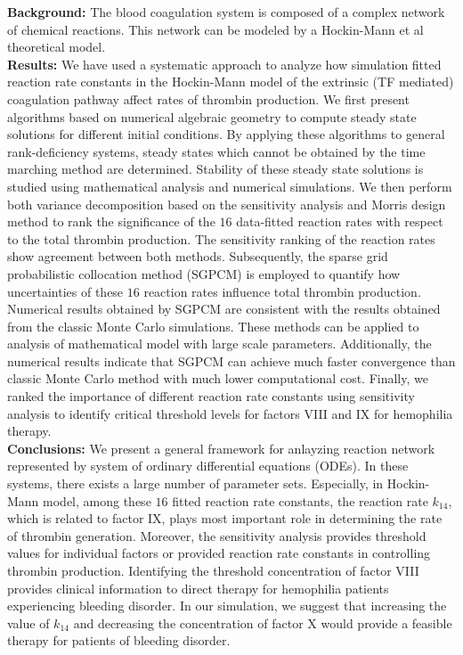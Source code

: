 {\bf Background:} The blood coagulation system is composed of a
complex network of chemical reactions. This network can be modeled
by a Hockin-Mann et al theoretical model.
\\{\bf Results:}
We have used a systematic approach to analyze how simulation fitted
reaction rate constants in the Hockin-Mann model of the extrinsic
(TF mediated) coagulation pathway affect rates of thrombin
production. We first present algorithms based on numerical algebraic
geometry to compute steady state solutions for different initial
conditions. By applying these algorithms to general rank-deficiency
systems, steady states which cannot be obtained by the time marching
method are determined. Stability of these steady state solutions is
studied using mathematical analysis and numerical simulations. We
then perform both variance decomposition based on the sensitivity
analysis and Morris design method to rank the significance of the
$16$ data-fitted reaction rates with respect to the total thrombin
production. The sensitivity ranking of the reaction rates show
agreement between both methods. Subsequently, the sparse grid
probabilistic collocation method (SGPCM) is employed to quantify how
uncertainties of these $16$ reaction rates influence total thrombin
production. Numerical results obtained by SGPCM are consistent with
the results obtained from the classic Monte Carlo simulations. These
methods can be applied to analysis of mathematical model with large
scale parameters. Additionally, the numerical results indicate that
SGPCM can achieve much faster convergence than classic Monte Carlo
method with much lower computational cost. Finally, we ranked the
importance of different reaction rate constants using sensitivity
analysis to identify critical threshold levels for factors VIII and
IX for hemophilia therapy.
\\{\bf Conclusions:} %
We present a general framework for anlayzing reaction network
represented by system of ordinary differential equations (ODEs). In
these systems, there exists a large number of parameter sets.
Especially, in Hockin-Mann model, among these $16$ fitted reaction
rate constants, the reaction rate $k_{14}$, which is related to
factor IX, plays most important role in determining the rate of
thrombin generation. Moreover, the sensitivity analysis provides
threshold values for individual factors or provided reaction rate
constants in controlling thrombin production. Identifying the
threshold concentration of factor VIII provides clinical information
to direct therapy for hemophilia patients experiencing bleeding
disorder. In our simulation, we suggest that increasing the value of
$k_{14}$ and decreasing the concentration of factor X would provide
a feasible therapy for patients of bleeding disorder.
